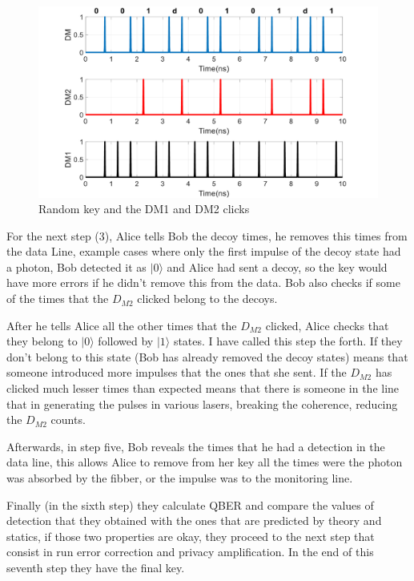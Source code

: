\begin{refsection}
\begin{figure}[hbt!]
\centering
\includegraphics[width=1\textwidth]{./sdf/tq_76558_cow_protocol/slides/figures/DM3.pdf}
\caption{Random key and the DM1 and DM2 clicks}
\label{fig:dm3}
\end{figure}

For the next step (3), Alice tells Bob the decoy times, he removes this times from the data Line, example cases where only the first impulse of the decoy state had a photon, Bob detected it as $|0\rangle$ and Alice had sent a decoy, so the key would have more errors if he didn't remove this from the data. Bob also checks if some of the times that the $D_{M2}$ clicked belong to the decoys.

After he tells Alice all the other times that the $D_{M2}$ clicked, Alice checks that they belong to $|0\rangle$ followed by $|1\rangle$ states. I have called this step the forth. If they don't belong to this state (Bob has already removed the decoy states) means that someone introduced more impulses that the ones that she sent. If the $D_{M2}$ has clicked much lesser times than expected means that there is someone in the line that in generating the pulses in various lasers, breaking the coherence, reducing the $D_{M2}$ counts.

Afterwards, in step five, Bob reveals the times that he had a detection in the data line, this allows Alice to remove from her key all the times were the photon was absorbed by the fibber, or the impulse was to the monitoring line.

Finally (in the sixth step) they calculate QBER and compare the values of detection that they obtained with the ones that are predicted by theory and statics, if those two properties are okay, they proceed to the next step that consist in run error correction and privacy amplification. In the end of this seventh step they have the final key.


\end{refsection}
